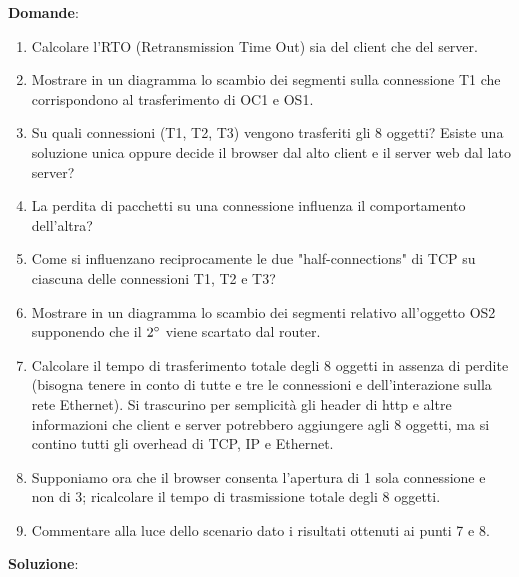 \documentclass[10pt]{article}
\begin{document}
	\textbf{Domande}:
	\begin{enumerate}
		\item Calcolare l'RTO (Retransmission Time Out) sia del client che del server.
		\item Mostrare in un diagramma lo scambio dei segmenti sulla connessione T1 che corrispondono al trasferimento di OC1 e OS1.
	\item Su quali connessioni (T1, T2, T3) vengono trasferiti gli 8 oggetti? Esiste una soluzione unica oppure decide il browser dal alto client e il server web dal lato server?
	\item La perdita di pacchetti su una connessione influenza il comportamento dell'altra?
	\item Come si influenzano reciprocamente le due "half-connections" di TCP su ciascuna delle connessioni T1, T2 e T3? 
	\item Mostrare in un diagramma lo scambio dei segmenti relativo all'oggetto OS2 supponendo che il $2 \degree$ viene scartato dal router.
	\item Calcolare il tempo di trasferimento totale degli 8 oggetti in assenza di perdite (bisogna tenere in conto di tutte e tre le connessioni e dell'interazione sulla rete Ethernet). Si trascurino per semplicità gli header di http e altre informazioni che client e server potrebbero aggiungere agli 8 oggetti, ma si contino tutti gli overhead di TCP, IP e Ethernet.
	\item Supponiamo ora che il browser consenta l'apertura di 1 sola connessione e non di 3; ricalcolare il tempo di trasmissione totale degli 8 oggetti.
	\item Commentare alla luce dello scenario dato i risultati ottenuti ai punti 7 e 8.
	\end{enumerate}
	\textbf{Soluzione}:
\end{document}
